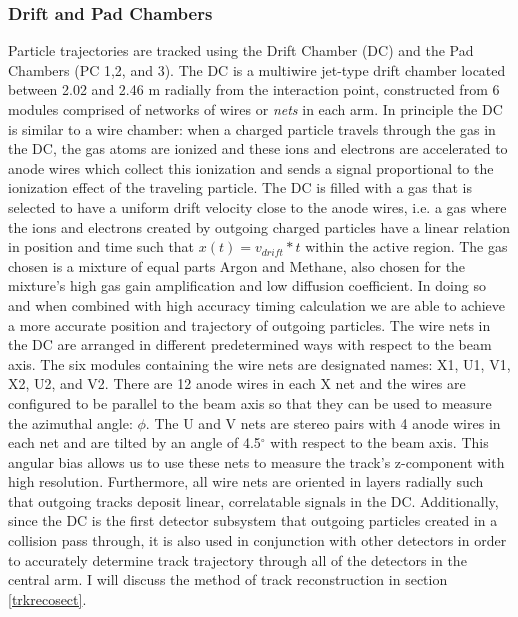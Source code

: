 \subsubsection{Drift and Pad Chambers}
Particle trajectories are tracked using the Drift Chamber (DC) and the Pad Chambers (PC 1,2, and 3)\citep{DCfocus}. The DC is a multiwire jet-type drift chamber located between 2.02 and 2.46 m radially from the interaction point, constructed from 6 modules comprised of networks of wires or \textit{nets} in each arm. In principle the DC is similar to a wire chamber: when a charged particle travels through the gas in the DC, the gas atoms are ionized and these ions and electrons are accelerated to anode wires which collect this ionization and sends a signal proportional to the ionization effect of the traveling particle. The DC is filled with a gas that is selected to have a uniform drift velocity close to the anode wires, i.e. a gas where the ions and electrons created by outgoing charged particles have a linear relation in position and time such that $x(t) = v_{drift} * t$ within the active region. The gas chosen is a mixture of equal parts Argon and Methane, also chosen for the mixture's high gas gain amplification and low diffusion coefficient. In doing so and when combined with high accuracy timing calculation we are able to achieve a more accurate position and trajectory of outgoing particles. The wire nets in the DC are arranged in different predetermined ways with respect to the beam axis. The six modules containing the wire nets are designated names: X1, U1, V1, X2, U2, and V2. There are 12 anode wires in each X net and the wires are configured to be parallel to the beam axis so that they can be used to measure the azimuthal angle: $\phi$. The U and V nets are stereo pairs with 4 anode wires in each net and are tilted by an angle of 4.5$^\circ$ with respect to the beam axis. This angular bias allows us to use these nets to measure the track's z-component with high resolution. Furthermore, all wire nets are oriented in layers radially such that outgoing tracks deposit linear, correlatable signals in the DC. Additionally, since the DC is the first detector subsystem that outgoing particles created in a collision pass through, it is also used in conjunction with other detectors in order to accurately determine track trajectory through all of the detectors in the central arm. I will discuss the method of track reconstruction in section \ref{trkrecosect}.


